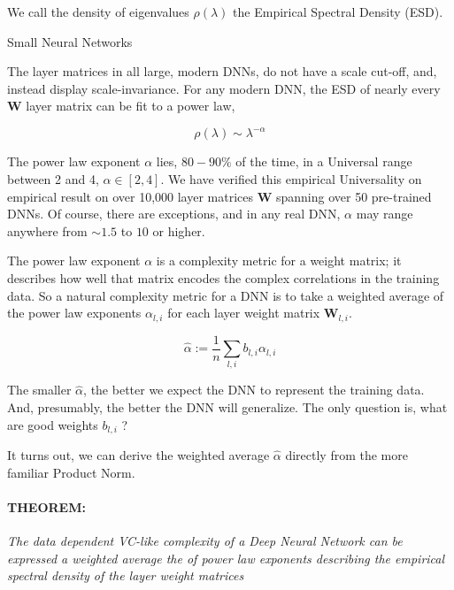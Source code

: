 We call the density of eigenvalues $\rho(\lambda)$ the Empirical Spectral Density (ESD).  

Small Neural Networks 

The layer matrices in all large, modern DNNs, do not have a scale cut-off, and, instead display scale-invariance.  
For any modern DNN, the ESD of nearly every \ $\mathbf{W}$ layer matrix can be fit to a power law,

$$\rho(\lambda)\sim\lambda^{-\alpha}$$

The power law exponent $\alpha$ lies, $80-90\%$ of the time, in a Universal range between 2 and 4, $\alpha\in[2,4]$.
We have verified this empirical Universality on empirical result on over 10,000 layer matrices $\mathbf{W}$ spanning over 50 pre-trained DNNs.
Of course, there are exceptions, and in any real DNN,  $\alpha$ may range anywhere from $\sim1.5$ to $10$ or higher.  

The power law exponent $\alpha$ is a complexity metric for a weight matrix; it describes how well that matrix encodes the complex correlations in the training data.
So a natural complexity metric for a DNN is to take a weighted average of the power law exponents $\alpha_{l,i}$ for each layer weight matrix $\mathbf{W}_{l,i}$.

$$\hat{\alpha}:=\dfrac{1}{n}\sum_{l,i}b_{l,i}\alpha_{l,i}$$

The smaller $\hat{\alpha}$, the better we expect the DNN to represent the training data. And, presumably, the better the DNN will generalize.
The only question is, what are good weights $b_{l,i}$ ?

It turns out, we can derive the weighted average $\hat{\alpha}$ directly from the more familiar Product Norm.



\paragraph{THEOREM:} \emph{The data dependent VC-like complexity of a Deep Neural Network can be expressed a weighted average the of power law exponents describing the empirical spectral density of the layer weight matrices}


